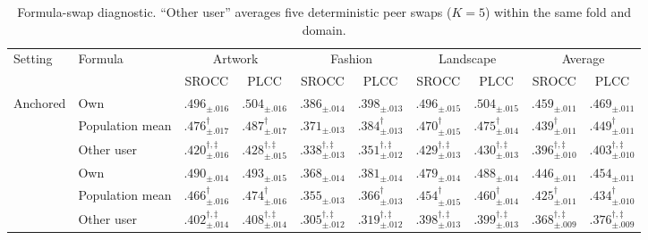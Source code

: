 \documentclass[10pt,twocolumn,letterpaper]{article}
\begin{document}
\begin{table}[!tbp]
\centering
\begin{threeparttable}
\caption{Formula-swap diagnostic. ``Other user'' averages five deterministic
peer swaps ($K=5$) within the same fold and domain.}
\label{tab:formula_swap}
\footnotesize
\setlength{\tabcolsep}{1.6pt}
   \begin{tabular}{ll cc cc cc cc}
        \toprule
        \multirow{2}{*}{Setting} & \multirow{2}{*}{Formula} & \multicolumn{2}{c}{Artwork} & \multicolumn{2}{c}{Fashion} & \multicolumn{2}{c}{Landscape} & \multicolumn{2}{c}{Average} \\
        \cmidrule(lr){3-4}\cmidrule(lr){5-6}\cmidrule(lr){7-8}\cmidrule(lr){9-10}
        & & SROCC & PLCC & SROCC & PLCC & SROCC & PLCC & SROCC & PLCC \\
        \midrule
        \multirow{3}{*}{Anchored} 
        & Own & $\bm{.496_{\pm .016}}$ & $\bm{.504_{\pm .016}}$ & $\bm{.386_{\pm .014}}$ & $\bm{.398_{\pm .013}}$ & $\bm{.496_{\pm .015}}$ & $\bm{.504_{\pm .015}}$ & $\bm{.459_{\pm .011}}$ & $\bm{.469_{\pm .011}}$ \\
        & Population mean & $.476_{\pm .017}^{\dagger}$ & $.487_{\pm .017}^{\dagger}$ & $.371_{\pm .013}$ & $.384_{\pm .013}^{\dagger}$ & $.470_{\pm .015}^{\dagger}$ & $.475_{\pm .014}^{\dagger}$ & $.439_{\pm .011}^{\dagger}$ & $.449_{\pm .011}^{\dagger}$ \\
        & Other user & $.420_{\pm .016}^{\dagger,\ddagger}$ & $.428_{\pm .015}^{\dagger,\ddagger}$ & $.338_{\pm .013}^{\dagger,\ddagger}$ & $.351_{\pm .012}^{\dagger,\ddagger}$ & $.429_{\pm .013}^{\dagger,\ddagger}$ & $.430_{\pm .013}^{\dagger,\ddagger}$ & $.396_{\pm .010}^{\dagger,\ddagger}$ & $.403_{\pm .010}^{\dagger,\ddagger}$ \\
        \addlinespace
        \multirow{3}{*}{Unanchored} 
        & Own & $\bm{.490_{\pm .014}}$ & $\bm{.493_{\pm .015}}$ & $\bm{.368_{\pm .014}}$ & $\bm{.381_{\pm .014}}$ & $\bm{.479_{\pm .014}}$ & $\bm{.488_{\pm .014}}$ & $\bm{.446_{\pm .011}}$ & $\bm{.454_{\pm .011}}$ \\
        & Population mean & $.466_{\pm .016}^{\dagger}$ & $.474_{\pm .016}^{\dagger}$ & $.355_{\pm .013}$ & $.366_{\pm .013}^{\dagger}$ & $.454_{\pm .015}^{\dagger}$ & $.460_{\pm .014}^{\dagger}$ & $.425_{\pm .011}^{\dagger}$ & $.434_{\pm .010}^{\dagger}$ \\
        & Other user & $.402_{\pm .014}^{\dagger,\ddagger}$ & $.408_{\pm .014}^{\dagger,\ddagger}$ & $.305_{\pm .012}^{\dagger,\ddagger}$ & $.319_{\pm .012}^{\dagger,\ddagger}$ & $.398_{\pm .013}^{\dagger,\ddagger}$ & $.399_{\pm .013}^{\dagger,\ddagger}$ & $.368_{\pm .009}^{\dagger,\ddagger}$ & $.376_{\pm .009}^{\dagger,\ddagger}$ \\

\end{tabular}
\end{threeparttable}
\end{table}
\end{document}
